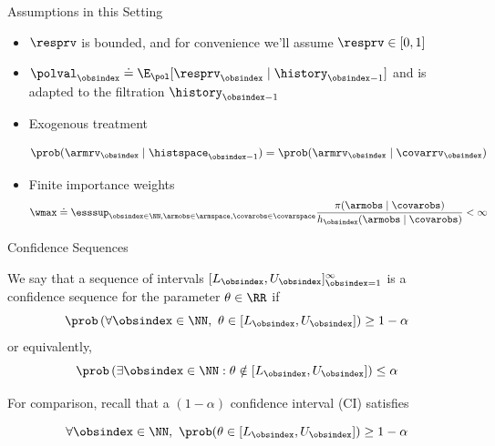 \documentclass[aspectratio=169, professionalfonts, handout]{beamer}
\begin{document}
\begin{frame}{Assumptions in this Setting}
	\begin{itemize}
		\item $\resprv$ is bounded, and for convenience we'll assume $\resprv \in [0,1]$
		      \vfill
		\item $\polval_{\obsindex} \doteq \E_{\pol} [\resprv_{\obsindex} \mid
				      \history_{\obsindex-1}]$ and is adapted to the filtration $\history_{\obsindex-1}$
		      \vfill

		\item 	Exogenous treatment

		      $$\prob(\armrv_{\obsindex} \mid \histspace_{\obsindex - 1}) =
			      \prob(\armrv_{\obsindex} \mid \covarrv_{\obsindex})$$

		\item Finite importance weights
		      \[\wmax \doteq \esssup_{\obsindex \in \NN, \armobs \in \armspace, \covarobs \in
				      \covarspace} \frac{\pi(\armobs \mid \covarobs)}{h_{\obsindex}(\armobs \mid
				      \covarobs)} < \infty\]
	\end{itemize}






\end{frame}


\begin{frame}{Confidence Sequences}
	\begin{definition}
		We say that a sequence of intervals $[L_\obsindex, U_\obsindex]_{\obsindex=1}^\infty$ is a confidence sequence for the parameter $\theta \in \RR$ if
		\begin{equation*}\label{eq:cs}
			\prob \left ( \forall \obsindex \in \NN,\ \theta \in [L_\obsindex, U_\obsindex] \right ) \geq 1-\alpha \end{equation*}
		or equivalently,
		\begin{equation*}
			\prob \left ( \exists \obsindex \in \NN : \theta \notin [L_\obsindex, U_\obsindex] \right ) \leq \alpha
		\end{equation*}
	\end{definition}

	\vfill \pause
	For comparison, recall that a $(1- \alpha)$ confidence interval (CI) satisfies

	$$\forall \obsindex \in \NN,\ \prob(\theta \in [L_\obsindex, U_\obsindex]) \geq 1-\alpha$$
\end{frame}
\end{document}
